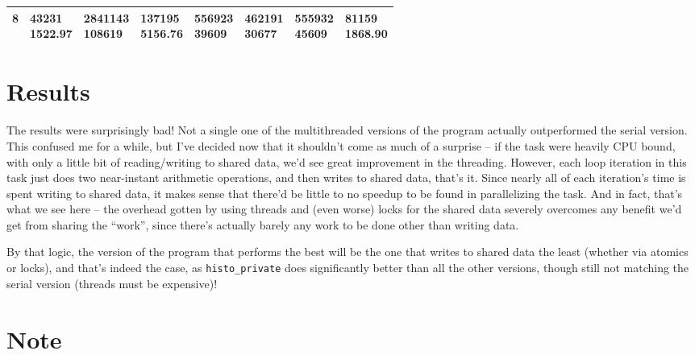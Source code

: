 \documentclass[letterpaper]{article}
\begin{document}
\begin{center}
\begin{tabular}{ |m{5em}|m{5em}|m{5em}|m{5em}|m{5em}|m{5em}|m{5em}|m{5em}| }
	\textbf{8}& \makecell{43231 \\[-0.5em] 1522.97}& \makecell{2841143 \\[-0.5em] 108619}& \makecell{137195 \\[-0.5em] 5156.76}& \makecell{556923 \\[-0.5em] 39609}& \makecell{462191 \\[-0.5em] 30677}& \makecell{555932 \\[-0.5em] 45609}& \makecell{81159 \\[-0.5em] 1868.90}\\ \hline
	\end{tabular} \end{center} 

	\section*{Results}

	The results were surprisingly bad! Not a single one of the multithreaded versions of the program actually outperformed the serial version. This confused me for a while, but I've decided now that it shouldn't come as much of a surprise -- if the task were heavily CPU bound, with only a little bit of reading/writing to shared data, we'd see great improvement in the threading. However, each loop iteration in this task just does two near-instant arithmetic operations, and then writes to shared data, that's it. Since nearly all of each iteration's time is spent writing to shared data, it makes sense that there'd be little to no speedup to be found in parallelizing the task. And in fact, that's what we see here -- the overhead gotten by using threads and (even worse) locks for the shared data severely overcomes any benefit we'd get from sharing the ``work'', since there's actually barely any work to be done other than writing data.

	\noindent By that logic, the version of the program that performs the best will be the one that writes to shared data the least (whether via atomics or locks), and that's indeed the case, as \verb|histo_private| does significantly better than all the other versions, though still not matching the serial version (threads must be expensive)!

	\section*{Note}
\end{document}
